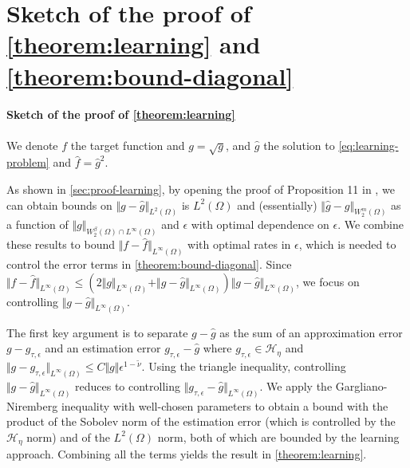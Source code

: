 \section{Sketch of the proof of \cref{theorem:learning} and \cref{theorem:bound-diagonal}}\label{sec:sketches}
%
\paragraph{Sketch of the proof of \cref{theorem:learning}} We denote $f$ the target function and $g = \sqrt{g}$, and $\hat g$ the solution to \cref{eq:learning-problem} and $\hat f = \hat g^2$.

As shown in \cref{sec:proof-learning}, by opening the proof of Proposition 11 in \cite{sampling-ulysse}, we can obtain bounds on $\Vert g - \hat g \Vert_{L^2(\Omega)}$ is $L^2(\Omega)$ and (essentially) $\Vert \hat g - g\Vert_{W^m_2(\Omega)}$ as a function of $\Vert g\Vert_{W^\beta_2(\Omega)\cap L^\infty(\Omega)}$ and $\epsilon$ with optimal dependence on $\epsilon$. We combine these results to bound $\Vert f - \hat f\Vert_{L^\infty(\Omega)}$ with optimal rates in $\epsilon$, which is needed to control the error terms in \cref{theorem:bound-diagonal}.
Since $\Vert f - \hat f\Vert_{L^\infty(\Omega)}\leq \left(2\Vert g\Vert_{L^\infty(\Omega)}+ \Vert g - \hat g\Vert_{L^\infty(\Omega)} \right)\Vert g- \hat g\Vert_{L^\infty(\Omega)}$, we focus on controlling $\Vert g - \hat g \Vert_{L^\infty(\Omega)}$.

The first key argument is to separate $g - \hat g$ as the sum of an approximation error $g - g_{\tau, \epsilon}$ and an estimation error $g_{\tau, \epsilon} - \hat g$ where $g_{\tau, \epsilon} \in \mathcal H_\eta$ and $\Vert g - g_{\tau, \epsilon}\Vert_{L^\infty(\Omega)}\leq C \Vert g \Vert \epsilon^{1-\tilde \nu}$. Using the triangle inequality, controlling $\Vert g - \hat g\Vert_{L^\infty(\Omega)}$ reduces to controlling $\Vert g_{\tau, \epsilon} - \hat g\Vert_{L^\infty(\Omega)}$. We apply the Gargliano-Niremberg inequality with well-chosen parameters to obtain a bound with the product of the Sobolev norm of the estimation error (which is controlled by the $\mathcal H_\eta$ norm) and of the $L^2(\Omega)$ norm, both of which are bounded by the learning approach. Combining all the terms yields the result in \cref{theorem:learning}.

